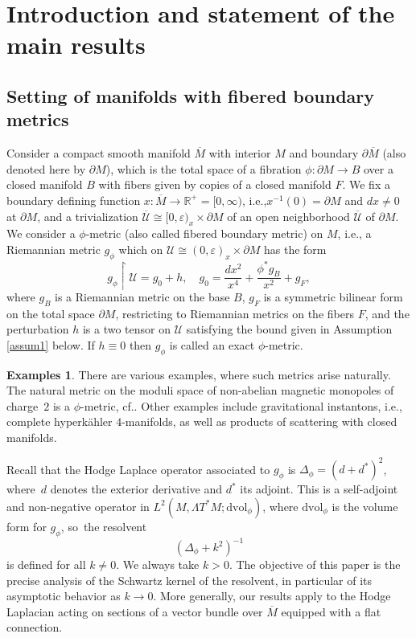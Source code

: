 \documentclass[11pt]{article}
\newcommand{\ie}{i.e.,\xspace}
\newcommand{\cf}{cf.\xspace}
\numberwithin{equation}{section}
\theoremstyle{plain}
\theoremstyle{definition}
\newtheorem{Exs}[Th]{Examples}
\newcommand{\R}{{\mathbb{R}}}
\newcommand{\Umathbar}{{\overline{\mathscr{U}}}}
\newcommand{\dvol}{\mathrm{dvol}}
\newcommand{\dM}{{\partial M}}
\newcommand{\Mbar}{{\overline{M}}}\let\M\Mbar
\let\eps\varepsilon
\begin{document}
\section{Introduction and statement of the main results}

\subsection{Setting of manifolds with fibered boundary metrics}

Consider a compact smooth manifold $\Mbar$
with interior $M$ and boundary $\partial \Mbar$
(also denoted here by $\partial M$),
which is the total space of a fibration
$\phi: \partial M \to B$ over a closed manifold $B$ with fibers given by
copies of a closed manifold $F$. We fix a boundary defining function
$x:\Mbar\to\R^+=[0,\infty)$, \ie $x^{-1}(0)=\dM$ and $dx\neq0$ at $\dM$, and a trivialization $\Umathbar\cong [0,\eps)_x\times\dM$ of an open
neighborhood $\Umathbar$ of $\partial M$. We consider a $\phi$-metric (also called fibered boundary metric) on $M$, \ie a Riemannian metric $g_\phi$ which on $\mathscr{U} \cong (0,\varepsilon)_x\times\partial M$ has the form
\begin{equation}\label{g-phi-def}
g_{\phi} \restriction \mathscr{U} = g_0 + h,\quad g_0=\frac{dx^{2}}{x^4} + \frac{\phi^{*}g_{B}}{x^{2}} + g_{F},
\end{equation}
where $g_{B}$ is a Riemannian metric on the base $B$, $g_{F}$ is a symmetric bilinear form on the
total space $\partial M$, restricting to Riemannian metrics on the fibers $F$, and the perturbation $h$ is a two tensor on $\mathscr{U}$ satisfying the bound given in Assumption \ref{assum1} below.
If $h\equiv 0$ then
$g_\phi$ is called an exact $\phi$-metric.

\begin{Exs}
There are various examples, where such metrics arise naturally.
The natural metric on the moduli space of non-abelian magnetic monopoles
of charge~$2$ is a $\phi$-metric, \cf \cite{gravi-ins, kottke-singer, fritsch}. Other examples include
gravitational instantons, \ie complete hyperkähler $4$-manifolds, as well as products
of scattering with closed manifolds.
\end{Exs}

Recall that the Hodge Laplace operator associated to $g_\phi$ is $\Delta_{\phi} = (d+d^*)^2$,
where~$d$ denotes the exterior derivative and
$d^*$ its adjoint. This is a self-adjoint and non-negative operator in $L^2(M,\Lambda T^*M; \dvol_\phi)$,
where $\dvol_\phi$ is the volume form for $g_\phi$, so~the resolvent
\[
(\Delta_{\phi}+k^2)^{-1}
\]
is defined for all $k\neq0$. We always take $k>0$. The objective of this paper is
the precise analysis of the Schwartz kernel of the resolvent, in particular of its asymptotic behavior as $k\to0$.
More generally, our results apply to the Hodge Laplacian acting on sections of a vector bundle over $\Mbar$ equipped with a flat connection.
\end{document}
